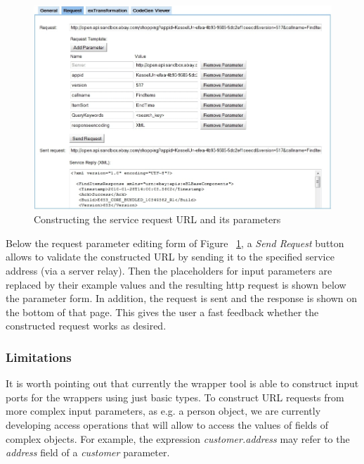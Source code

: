 \begin{figure}
  \begin{center}
    \includegraphics[width=\linewidth]{images/ServiceWrapperToolGVSWithRequestExample.png}
    \caption{Constructing the service request URL and its parameters}
    \label{fig:construct_service_request}
  \end{center}
\end{figure}

Below the request parameter editing form of Figure ~\ref{fig:construct_service_request}, a \textit{Send Request} button allows to validate the constructed URL by sending it to the specified service address (via a server relay). Then the placeholders for input parameters are replaced by their example values and the resulting http request is shown below the parameter form. In addition, the request is sent and the response is shown on the bottom of that page. This gives the user a fast feedback whether the constructed request works as desired. 

\subsubsection{Limitations} %
\label{ssub:limitations}

It is worth pointing out that currently the wrapper tool is able to construct input ports for the wrappers using just basic types. To construct URL requests from more complex input parameters, as e.g. a person object, we are currently developing access operations that will allow to access the values of fields of complex objects. For example, the expression \emph{customer.address} may refer to the \emph{address} field of a \emph{customer} parameter.  

